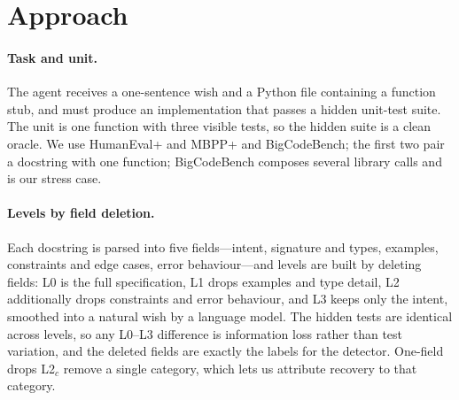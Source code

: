 \documentclass{article}
\title{%
    #1\\[0.7em]
    {\normalsize\normalfont
      Columbia COMS 4705 Project Milestone
    }\\[0.8em]
    \parbox{0.95\textwidth}{%
      \normalfont\small\centering

      \textbf{Keywords:} \textit{#2}
      \par\vspace{0.4em}

      \textbf{TA Mentor:} #3%

      \if\relax\detokenize{#4}\relax\else
        \par\vspace{0.4em}
        \textbf{External Collaborators:} #4%
      \fi

      \if\relax\detokenize{#5}\relax\else
        \par\vspace{0.4em}
        \textbf{Sharing Project:} #5%
      \fi
      \par
    }%
  }%
\author{
  Yanhao Bai \quad Kaitlyn Bassford \quad Wen Tao Koh \\
  Department of Computer Science, Columbia University \\
  \texttt{\{yb2630, kmb2297, wk2439\}@columbia.edu}
}
\begin{document}
\maketitle

\begin{abstract}
Wish-driven programming---stating an intent and letting an agent build the artifact---fails
quietly: the program runs, passes the tests the user remembered to mention, and violates a
requirement nobody wrote down. We degrade benchmark specifications into wishes by deleting
fields mechanically and train a small
\emph{silence detector} that predicts which requirement categories a wish leaves implicit and
uses that prediction to target clarification questions. In a 100-task pilot, targeted
questioning recovers 59\% of the specification--wish gap with 2.6 questions per task, against
42\% for generic clarification at 4.1 questions, while a harness that can read neighbouring
code recovers 19\%.
\end{abstract}

\section{Approach}

\paragraph{Task and unit.}
The agent receives a one-sentence wish and a Python file containing a function stub, and must
produce an implementation that passes a hidden unit-test suite. The unit is one function
with three visible tests, so the hidden suite is a clean oracle. We use HumanEval+ and MBPP+ \citep{liu2023evalplus} and BigCodeBench; the first two
pair a docstring with one function; BigCodeBench composes several library calls and is our
stress case.

\paragraph{Levels by field deletion.}
Each docstring is parsed into five fields---intent, signature and types, examples, constraints
and edge cases, error behaviour---and levels are built by deleting fields: L0 is the full
specification, L1 drops examples and type detail, L2 additionally drops constraints and error
behaviour, and L3 keeps only the intent, smoothed into a natural wish by a language model. The
hidden tests are identical across levels, so any L0--L3 difference is information loss rather
than test variation, and the deleted fields are exactly the labels for the detector. One-field
drops L2$_c$ remove a single category, which lets us attribute recovery to that category.
\end{document}
